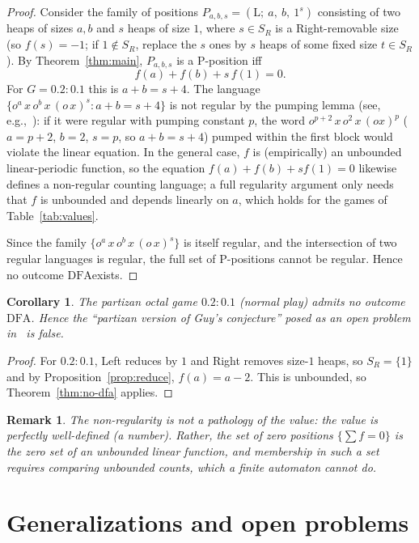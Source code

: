 \documentclass[11pt]{article}
\newtheorem{corollary}[theorem]{Corollary}
\newtheorem{remark}[theorem]{Remark}
\newcommand{\outL}{\ensuremath{\mathrm{L}}}
\newcommand{\outP}{\ensuremath{\mathrm{P}}}
\newcommand{\DFA}{\ensuremath{\mathrm{DFA}}}
\begin{document}
\begin{proof}
Consider the family of positions $P_{a,b,s}=(\outL;\ a,\ b,\ 1^s)$ consisting of two heaps of
sizes $a,b$ and $s$ heaps of size $1$, where $s\in S_R$ is a Right-removable size (so
$f(s)=-1$; if $1\notin S_R$, replace the $s$ ones by $s$ heaps of some fixed size
$t\in S_R$). By Theorem~\ref{thm:main}, $P_{a,b,s}$ is a $\outP$-position iff
\[
f(a)+f(b)+s\,f(1)=0.
\]
For $G=0.2:0.1$ this is $a+b=s+4$. The language
$\{o^a\,x\,o^b\,x\,(o\,x)^s : a+b=s+4\}$ is not regular by the pumping lemma (see,
e.g.,~\cite{HopcroftUllman}): if it were
regular with pumping constant $p$, the word $o^{p+2}\,x\,o^2\,x\,(ox)^{p}$ ($a=p+2$, $b=2$,
$s=p$, so $a+b=s+4$) pumped within the first block would violate the linear equation. In the
general case, $f$ is (empirically) an unbounded linear-periodic function, so the equation
$f(a)+f(b)+s f(1)=0$ likewise defines a non-regular counting language; a full regularity
argument only needs that $f$ is unbounded and depends linearly on $a$, which holds for the
games of Table~\ref{tab:values}.

Since the family $\{o^a\,x\,o^b\,x\,(o\,x)^s\}$ is itself regular, and the intersection of
two regular languages is regular, the full set of $\outP$-positions cannot be regular. Hence
no outcome \DFA exists.
\end{proof}

\begin{corollary}\label{cor:counterexample}
The partizan octal game $0.2:0.1$ (normal play) admits no outcome \DFA. Hence the
``partizan version of Guy's conjecture'' posed as an open problem in~\cite{LiangFA} is
false.
\end{corollary}

\begin{proof}
For $0.2:0.1$, Left reduces by $1$ and Right removes size-$1$ heaps, so $S_R=\{1\}$ and by
Proposition~\ref{prop:reduce}, $f(a)=a-2$. This is unbounded, so Theorem~\ref{thm:no-dfa}
applies.
\end{proof}

\begin{remark}
The non-regularity is not a pathology of the value: the value is perfectly well-defined (a
number). Rather, the set of zero positions $\{\sum f=0\}$ is the zero set of an unbounded
linear function, and membership in such a set requires comparing unbounded counts, which a
finite automaton cannot do.
\end{remark}

\section{Generalizations and open problems}\label{sec:open}
\end{document}
